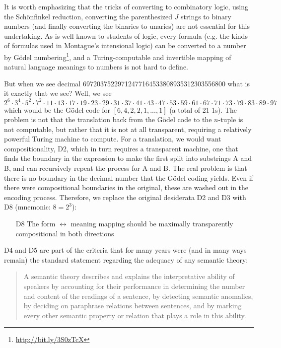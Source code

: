 \documentclass[output=paper]{langscibook}
\begin{document}
It is worth emphasizing that the tricks of converting to combinatory logic,
using the Schönfinkel reduction, converting the parenthesized $J$ strings to
binary numbers (and finally converting the binaries to unaries) are not
essential for this undertaking. As is well known to students of logic, every
formula (e.g. the kinds of formulas used in Montague's intensional logic) can
be converted to a number by
Gödel numbering\footnote{\url{http://bit.ly/3S0zTcX}}, and a
Turing-computable and invertible mapping of natural language meanings to
numbers is not hard to define.

But when we see decimal 69720375229712477164533808935312303556800 what is it
exactly that we see? Well, we see $2^6\cdot 3^4\cdot 5^2\cdot 7^2\cdot 11\cdot
13\cdot 17\cdot 19\cdot 23\cdot 29\cdot 31\cdot 37\cdot 41\cdot 43\cdot
47\cdot 53\cdot 59\cdot 61\cdot 67\cdot 71\cdot 73\cdot 79\cdot 83\cdot
89\cdot 97$ which would be the Gödel code for $[6,4,2,2,1,...,1]$ (a
total of 21 1s). The problem is not that the translation back from the Gödel
code to the $n$-tuple is not computable, but rather that it is not at all
transparent, requiring a relatively powerful Turing machine to compute. For a
translation, we would want compositionality, D2, which in turn requires a
transparent machine, one that finds the boundary in the expression to make the
first split into substrings A and B, and can recursively repeat the process
for A and B. The real problem is that there is no boundary in the decimal
number that the Gödel coding yields. Even if there were compositional
boundaries in the original, these are washed out in the encoding process.
Therefore, we replace the original desiderata D2 and D3 with D8 (mnemonic:
$8=2^3$):

\begin{itemize}
\item[D8] The form $\leftrightarrow$ meaning mapping should be maximally
  transparently compositional in both directions
\end{itemize}

\noindent
D4 and D5 are part of the \citet{Katz:1963} criteria that
for many years were (and in many ways remain) the standard statement regarding
the adequacy of any semantic theory:

\begin{quote}
A semantic theory describes and explains the interpretative ability of
speakers by accounting for their performance in determining the number and
content of the readings of a sentence, by detecting semantic anomalies, by
deciding on paraphrase relations between sentences, and by marking every other
semantic property or relation that plays a role in this ability.
\end{quote}
\end{document}
